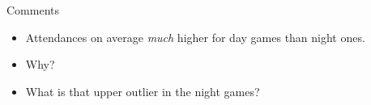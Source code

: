 \documentclass[unknownkeysallowed]{beamer}\usepackage[]{graphicx}\usepackage[]{color}
\begin{document}
\begin{frame}[fragile]{Comments}
  
  \begin{itemize}
  \item Attendances on average \emph{much} higher for day games than
    night ones.
  \item Why?
  \item What is that upper outlier in the night games?
  \end{itemize}
  
\end{frame}

%  
%    
%    
%  
%  
%
%
%
%
%  
%
%
%
%
%  
\end{document}
